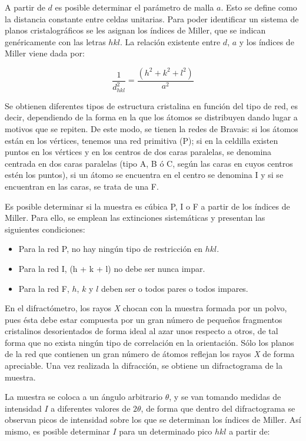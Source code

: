 \documentclass[a4paper,twocolumn,10pt]{article}
\begin{document}
A partir de $d$ es posible determinar el parámetro de malla $a$. Esto se define como la distancia constante entre celdas unitarias. Para poder identificar un sistema de planos cristalográficos se les asignan los índices de Miller, que se indican genéricamente con las letras $hkl$. La relación existente entre $d$, $a$ y los índices de Miller viene dada por:

\begin{equation}
\frac{1}{d_{hkl}^2} = \frac{(h^2 + k^2 + l^2)}{a^2}
\end{equation}


Se obtienen diferentes tipos de estructura cristalina en función del tipo de red, es decir, dependiendo de la forma en la que los átomos se distribuyen dando lugar a motivos que se repiten. De este modo, se tienen la redes de Bravais: si los átomos están en los vértices, tenemos una red primitiva (P);
si en la celdilla existen puntos en los vértices y en los centros de dos caras paralelas, se denomina centrada en dos caras paralelas (tipo A, B ó C, según las caras en cuyos centros estén los puntos), si un átomo se encuentra en el centro se denomina  I y si se encuentran en las caras, se trata de una  F. 

Es posible determinar si la muestra es cúbica P, I o F a partir de los índices de Miller. Para ello, se emplean las extinciones sistemáticas y presentan las siguientes condiciones:

\begin{itemize}
\item Para la red P, no hay ningún tipo de restricción en $hkl$.
\item Para la red I, (h + k + l) no debe ser nunca impar.
\item Para la red F, $h$, $k$ y $l$ deben ser o todos pares o todos impares.
\end{itemize}


En el difractómetro, los rayos \textit{X} chocan con la muestra formada por un  polvo, pues ésta debe estar compuesta por un gran número de pequeños fragmentos cristalinos desorientados de forma ideal al azar unos respecto a otros, de tal forma que no exista ningún tipo de correlación en la orientación. Sólo los planos de la red que contienen un gran número de átomos reflejan los rayos \textit{X} de forma apreciable. Una vez realizada la difracción, se obtiene un difractograma de la muestra.

La muestra se coloca a un ángulo arbitrario $\theta$, y se van tomando medidas de intensidad $I$ a diferentes valores de $2\theta$, de forma que dentro del difractograma se observan picos de intensidad sobre los que se determinan los índices de Miller. Así mismo, es posible determinar $I$ para un determinado pico $hkl$ a partir de:
\end{document}
